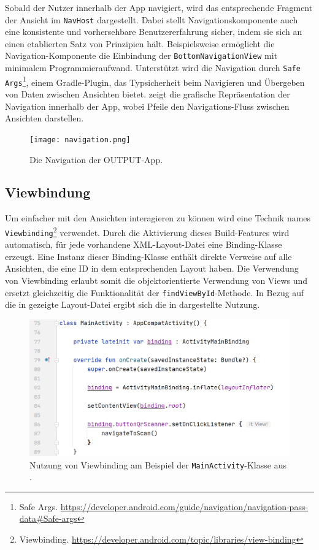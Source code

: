 Sobald der Nutzer innerhalb der App navigiert, wird das entsprechende Fragment der Ansicht im \texttt{NavHost} dargestellt. Dabei stellt Navigationskomponente auch eine konsistente und vorhersehbare Benutzererfahrung sicher, indem sie sich an einen etablierten Satz von Prinzipien hält. Beispielsweise ermöglicht die Navigation-Komponente die Einbindung der \texttt{BottomNavigationView} mit minimalem Programmieraufwand. Unterstützt wird die Navigation durch \texttt{Safe Args}\footnote{Safe Args. \url{https://developer.android.com/guide/navigation/navigation-pass-data\#Safe-args}}, einem Gradle-Plugin, das Typsicherheit beim Navigieren und Übergeben von Daten zwischen Ansichten bietet.  zeigt die grafische Repräsentation der Navigation innerhalb der App, wobei Pfeile den Navigations-Fluss zwischen Ansichten darstellen.   

\begin{figure}[H]
  \texttt{[image: navigation.png]}
  \caption{Die Navigation der OUTPUT-App.}\label{fig:navigation}
\end{figure}


\subsection{Viewbindung}

Um einfacher mit den Ansichten interagieren zu können wird eine Technik names \texttt{Viewbinding}\footnote{Viewbinding. \url{https://developer.android.com/topic/libraries/view-binding}} verwendet. Durch die Aktivierung dieses Build-Features wird automatisch, für jede vorhandene XML-Layout-Datei eine Binding-Klasse erzeugt. Eine Instanz dieser Binding-Klasse enthält direkte Verweise auf alle Ansichten, die eine ID in dem entsprechenden Layout haben. Die Verwendung von Viewbinding erlaubt somit die objektorientierte Verwendung von Views und ersetzt gleichzeitig die Funktionalität der \texttt{findViewById}-Methode. In Bezug auf die in  gezeigte Layout-Datei ergibt sich die in  dargestellte Nutzung.

\begin{figure}[H]
    \includegraphics[width=1\linewidth]{viewbinding.png}
    \caption{Nutzung von Viewbinding am Beispiel der \texttt{MainActivity}-Klasse aus .}\label{fig:viewbinding}
\end{figure}

